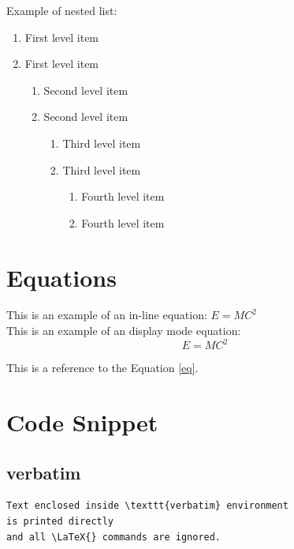 \documentclass[a4paper, oneside]{book}
\begin{document}
Example of nested list:
\begin{enumerate}
   \item First level item
   \item First level item
   \begin{enumerate}
     \item Second level item
     \item Second level item
     \begin{enumerate}
       \item Third level item
       \item Third level item
       \begin{enumerate}
         \item Fourth level item
         \item Fourth level item
       \end{enumerate}
     \end{enumerate}
   \end{enumerate}
 \end{enumerate}


\section{Equations}

This is an example of an in-line equation: $E = MC^2$\\
This is an example of an display mode equation:
\begin{equation}
    E = MC^2
\label{eq}
\end{equation}

This is a reference to the Equation \ref{eq}.

\section{Code Snippet}

\subsection{verbatim}
\begin{verbatim}
Text enclosed inside \texttt{verbatim} environment 
is printed directly 
and all \LaTeX{} commands are ignored.
\end{verbatim}
\end{document}
